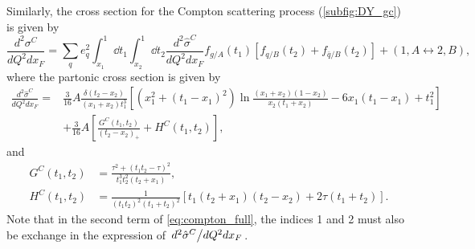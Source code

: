 Similarly, the cross section for the Compton scattering process (\cref{subfig:DY_gc}) is given by 
\begin{equation}
	\frac{d^2\sigma^C}{dQ^2dx_{F}} = \sum_q e^2_q \int^1_{x_1} \dd{t_1} \int^1_{x_2} \dd{t_2}
	\frac{d^2\hat{\sigma}^{C}}{dQ^2dx_F} f_{g/A}\left(t_1\right)
	\left[f_{q/B}\left(t_2\right) +f_{\bar{q}/B}\left(t_2\right) \right] + \left(1,A\leftrightarrow 2,B\right),
	\label{eq:compton_full}
\end{equation}
where the partonic cross section is given by
\begin{equation}
	\begin{split}
		\frac{d^2\hat{\sigma}^{C}}{dQ^2dx_F} =&\frac{3}{16} A \frac{\delta\left(t_2-x_2\right)}{\left(x_1+x_2\right)t_1^3}\left[ \left(x_1^2+\left(t_1-x_1\right)^2\right)\ln\frac{\left(x_1+x_2\right)\left(1-x_2\right)}{x_2\left(t_1+x_2\right)} - 6x_1\left(t_1-x_1\right)+t_1^2\right]\\
		&+\frac{3}{16}A\left[\frac{G^C\left(t_1,t_2\right)}{\left(t_2-x_2\right)_{+}} + H^C \left(t_1,t_2\right) \right],
	\end{split}
\end{equation}
and
\begin{align}
	G^C\left(t_1,t_2\right) &= \frac{\tau^2+\left(t_1t_2-\tau\right)^2}{t_1^3t_2^2\left(t_2+x_1\right)},\\
	H^C\left(t_1,t_2\right) &= \frac{1}{\left(t_1t_2\right)^2\left(t_1+t_2\right)^2}\left[t_1\left(t_2+x_1\right)\left(t_2-x_2\right)+2\tau\left(t_1+t_2\right)\right].
\end{align}
Note that in the second term of \cref{eq:compton_full}, the indices 1 and 2 must also be exchange in
the expression of $\flatfrac{d^2\hat{\sigma}^{C}}{dQ^2dx_F}$.

